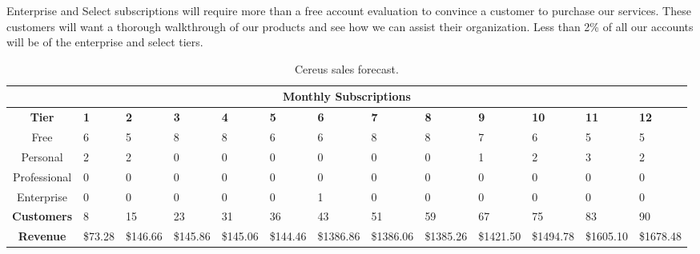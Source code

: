 Enterprise and Select subscriptions will require more than a free account evaluation to convince a customer to purchase our services. These customers will want a thorough walkthrough of our products and see how we can assist their organization. Less than 2\% of all our accounts will be of the enterprise and select tiers.


\begin{sidewaystable}
\begin{table}[H]
  \caption{Cereus sales forecast.}
  \centering
  \setlength\tabcolsep{5pt}
  \def\arraystretch{1.2}%

  \begin{tabularx}{\textwidth}{X X X X X X X X X X X X X}

    \multicolumn{13}{c}{\textbf{Monthly Subscriptions}} \\

    \hline
    
    \multicolumn{1}{c|}{\textbf{Tier}} & \textbf{1} & \textbf{2} & \textbf{3} & \textbf{4} & \textbf{5} & \textbf{6} & \textbf{7} & \textbf{8} & \textbf{9} & \textbf{10} & \textbf{11} & \textbf{12}  \\

    \hline

    \multicolumn{1}{c|}{Free} & 6 & 5 & 8 & 8 & 6 & 6 & 8 & 8 & 7 & 6 & 5 & 5  \\

    \multicolumn{1}{c|}{Personal} & 2 & 2 & 0 & 0 & 0 & 0 & 0 & 0 & 1 & 2 & 3 & 2  \\

    \multicolumn{1}{c|}{Professional} & 0 & 0 & 0 & 0 & 0 & 0 & 0 & 0 & 0 & 0 & 0 & 0  \\

    \multicolumn{1}{c|}{Enterprise} & 0 & 0 & 0 & 0 & 0 & 1 & 0 & 0 & 0 & 0 & 0 & 0  \\

    \hline

    \multicolumn{1}{c|}{\textbf{Customers}} & 8 & 15 & 23 & 31 & 36 & 43 & 51 & 59 & 67 & 75 & 83 & 90  \\

    \hline

    \multicolumn{1}{c|}{\textbf{Revenue}} & \$73.28 & \$146.66 & \$145.86 & \$145.06 & \$144.46 & \$1386.86 & \$1386.06  & \$1385.26 & \$1421.50 & \$1494.78 & \$1605.10 & \$1678.48  \\

  \end{tabularx}
  \label{table.sales.forecast}
\end{table}
\end{sidewaystable}
